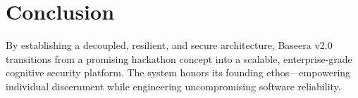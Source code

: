 \documentclass[11pt,a4paper]{report}
\begin{document}
\section{Conclusion}
By establishing a decoupled, resilient, and secure architecture, Baseera v2.0 transitions from a promising hackathon concept into a scalable, enterprise-grade cognitive security platform. The system honors its founding ethos—empowering individual discernment while engineering uncompromising software reliability.
\end{document}
